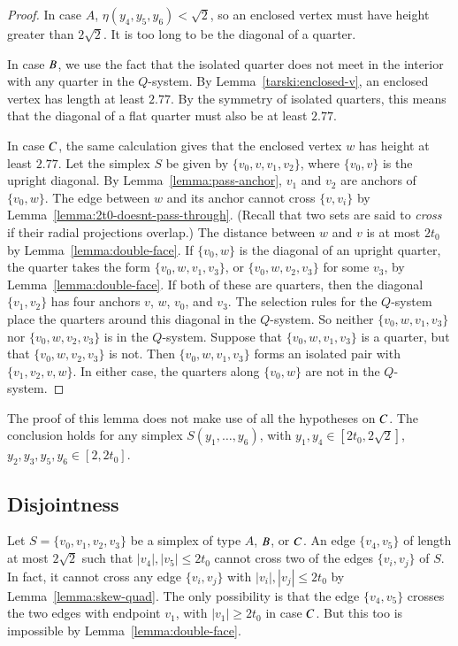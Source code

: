 \begin{proof}
In case $A$, $\eta(y_4,y_5,y_6)<\sqrt{2}$, so an enclosed vertex
must have height greater than $2\sqrt{2}$.  It is too long to be
the diagonal of a quarter.

In case $B$, we use the fact that the isolated quarter does not
meet in the interior with any quarter in the $Q$-system. 
By Lemma~\ref{tarski:enclosed-v}, an
enclosed vertex has length at least $2.77$.
By the symmetry of isolated quarters, this means that the diagonal
of a flat quarter must also be at least $2.77$.

In case $C$, the same calculation gives that the enclosed vertex
$w$ has height at least $2.77$.  Let the simplex $S$ be given by
$\{v_0,v,v_1,v_2\}$, where $\{v_0,v\}$ is the upright diagonal. By
Lemma~\ref{lemma:pass-anchor}, $v_1$ and $v_2$ are anchors of
$\{v_0,w\}$. The edge between $w$ and its anchor cannot cross
$\{v,v_i\}$ by Lemma~\ref{lemma:2t0-doesnt-pass-through}. (Recall
that two sets are said to {\it cross\/} if their radial
projections overlap.) The distance between $w$ and $v$ is at most
$2t_0$ by Lemma~\ref{lemma:double-face}. If $\{v_0,w\}$ is the
diagonal of an upright quarter, the quarter takes the form
$\{v_0,w,v_1,v_3\}$, or $\{v_0,w,v_2,v_3\}$ for some $v_3$, by
Lemma~\ref{lemma:double-face}. If both of these are quarters, then
the diagonal $\{v_1,v_2\}$ has four anchors $v$, $w$, $v_0$, and
$v_3$. The selection rules for the $Q$-system place the quarters
around this diagonal in the $Q$-system. So neither $\{v_0,w,v_1,v_3\}$
nor $\{v_0,w,v_2,v_3\}$ is in the $Q$-system. Suppose that
$\{v_0,w,v_1,v_3\}$ is a quarter, but that $\{v_0,w,v_2,v_3\}$ is not.
Then $\{v_0,w,v_1,v_3\}$ forms an isolated pair with $\{v_1,v_2,v,w\}$.
In either case, the quarters along $\{v_0,w\}$ are not in the
$Q$-system.
\end{proof}

\begin{remark}  The proof of this lemma does not make use of all the hypotheses
on $C$.  The conclusion holds for any simplex
$S(y_1,\ldots,y_6)$, with $y_1,y_4\in[2t_0,2\sqrt{2}]$,
$y_2,y_3,y_5,y_6\in[2,2t_0]$.
\end{remark}

\subsection{Disjointness}%

Let $S=\{v_0,v_1,v_2,v_3\}$ be a simplex of type $A$, $B$, or
$C$. An edge $\{v_4,v_5\}$ of length at most $2\sqrt{2}$ such
that $|v_4|,|v_5|\le 2t_0$ cannot cross two of the edges
$\{v_i,v_j\}$ of $S$.  In fact, it cannot cross any edge $\{v_i,v_j\}$
with $|v_i|,|v_j|\le 2t_0$ by Lemma~\ref{lemma:skew-quad}.  The
only possibility is that the edge $\{v_4,v_5\}$ crosses the two
edges with endpoint $v_1$, with $|v_1|\ge2t_0$ in case $C$.  But
this too is impossible by Lemma~\ref{lemma:double-face}.

